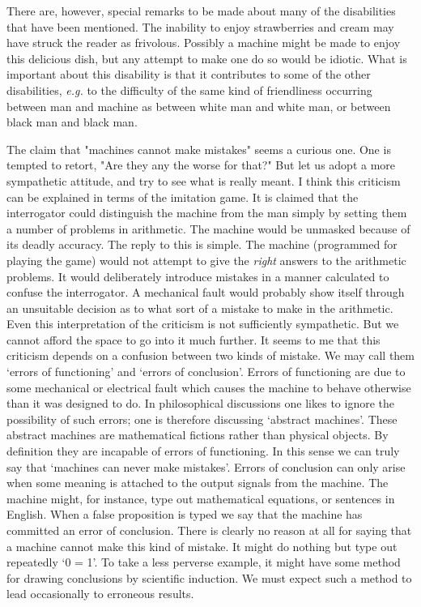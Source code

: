 \documentclass[12pt]{article}
\begin{document}
    There are, however, special remarks to be made about many of the disabilities that have been mentioned. The inability to enjoy strawberries and cream may have struck the reader as frivolous. Possibly a machine might be made to enjoy this delicious dish, but any attempt to make one do so would be idiotic. What is important about this disability is that it contributes to some of the other disabilities, \textit{e.g.} to the difficulty of the same kind of friendliness occurring between man and machine as between white man and white man, or between black man and black man.

    The claim that "machines cannot make mistakes" seems a curious one. One is tempted to retort, "Are they any the worse for that?" But let us adopt a more sympathetic attitude, and try to see what is really meant. I think this criticism can be explained in terms of the imitation game. It is claimed that the interrogator could distinguish the machine from the man simply by setting them a number of problems in arithmetic. The machine would be unmasked because of its deadly accuracy. The reply to this is simple. The machine (programmed for playing the game) would not attempt to give the \textit{right} answers to the arithmetic problems. It would deliberately introduce mistakes in a manner calculated to confuse the interrogator. A mechanical fault would probably show itself through an unsuitable decision as to what sort of a mistake to make in the arithmetic. Even this interpretation of the criticism is not sufficiently sympathetic. But we cannot afford the space to go into it much further. It seems to me that this criticism depends on a confusion between two kinds of mistake. We may call them ‘errors of functioning' and ‘errors of conclusion'. Errors of functioning are due to some mechanical or electrical fault which causes the machine to behave otherwise than it was designed to do. In philosophical discussions one likes to ignore the possibility of such errors; one is therefore discussing ‘abstract machines'. These abstract machines are mathematical fictions rather than physical objects. By definition they are incapable of errors of functioning. In this sense we can truly say that ‘machines can never make mistakes'. Errors of conclusion can only arise when some meaning is attached to the output signals from the machine. The machine might, for instance, type out mathematical equations, or sentences in English. When a false proposition is typed we say that the machine has committed an error of conclusion. There is clearly no reason at all for saying that a machine cannot make this kind of mistake. It might do nothing but type out repeatedly ‘0 = 1'. To take a less perverse example, it might have some method for drawing conclusions by scientific induction. We must expect such a method to lead occasionally to erroneous results.
\end{document}
